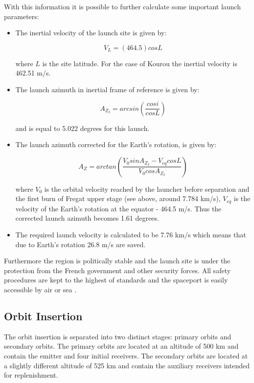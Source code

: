 With this information it is possible to further calculate some important launch parameters:

\begin{itemize}
	\item The inertial velocity of the launch site is given by:
	
	\begin{equation} 
 		V_L = (464.5) cos L 
	\end{equation}
	
	where $L$ is the site latitude. For the case of Kourou the inertial velocity is 462.51 m/s.
	\item The launch azimuth in inertial frame of reference is given by:
	
	\begin{equation} 
 		A_{Z_I} = arcsin(\frac{cos i}{cos L})
	\end{equation}
	
	and is equal to 5.022 degrees for this launch.
	\item The launch azimuth corrected for the Earth's rotation, is given by:
	
	\begin{equation} 
 		A_Z = arctan(\frac{V_0sinA_{Z_I}-V_{eq}cosL}{V_0cosA_{Z_I}})
	\end{equation}
	
	where $V_0$ is the orbital velocity reached by the launcher before separation and the first burn of Fregat upper stage (see above, around 7.784 km/s), $V_{eq}$ is the velocity of the Earth's rotation at the equator - 464.5 m/s. Thus the corrected launch azimuth becomes 1.61 degrees. 
	
	\item The required launch velocity is calculated to be 7.76 km/s which means that due to Earth's rotation 26.8 m/s are saved.
\end{itemize}

Furthermore the region is politically stable and the launch site is under the protection from the French government and other security forces. All safety procedures are kept to the highest of standards and the spaceport is easily accessible by air or sea \cite{soyuzman}.

\subsection{Orbit Insertion}
\label{frLSOI}

The orbit insertion is separated into two distinct stages: primary orbits and secondary orbits. The primary orbits are located at an altitude of 500 km and contain the emitter and four initial receivers. The secondary orbits are located at a slightly different altitude of 525 km and contain the auxiliary receivers intended for replenishment.

